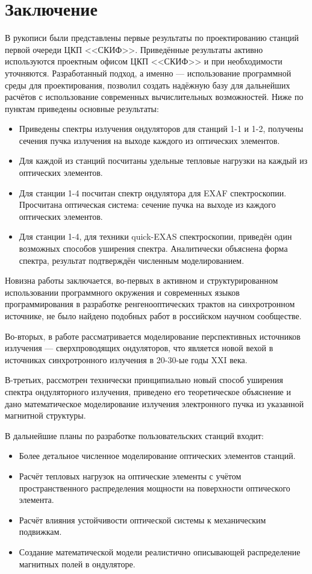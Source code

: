 \chapter{Заключение}

В рукописи были представлены первые результаты по проектированию станций первой очереди ЦКП <<СКИФ>>. Приведённые результаты активно используются проектным офисом ЦКП <<СКИФ>> и при необходимости уточняются. Разработанный подход, а именно --- использование программной среды для проектирования, позволил создать надёжную базу для дальнейших расчётов с использование современных вычислительных возможностей. Ниже по пунктам приведены основные результаты: 

\begin{itemize}
	\item Приведены спектры излучения ондуляторов для станций 1-1 и 1-2, получены сечения пучка излучения на выходе каждого из оптических элементов.
	\item Для каждой из станций посчитаны удельные тепловые нагрузки на каждый из оптических элементов.
	\item Для станции 1-4 посчитан спектр ондулятора для EXAF спектроскопии. Просчитана оптическая система: сечение пучка на выходе из каждого оптических элементов.
	\item Для станции 1-4, для техники quick-EXAS спектроскопии, приведён один возможных способов уширения спектра. Аналитически объяснена форма спектра, результат подтверждён численным моделированием.
\end{itemize}

Новизна работы заключается, во-первых в активном и структурированном использовании программного окружения и современных языков программирования в разработке ренгенооптических трактов на синхротронном источнике, не было найдено подобных работ в российском научном сообществе. 

Во-вторых, в работе рассматривается моделирование перспективных источников излучения --- сверхпроводящих ондуляторов, что является новой вехой в источниках синхротронного излучения в 20-30-ые годы XXI века. 

В-третьих, рассмотрен технически принципиально новый способ уширения спектра ондуляторного излучения, приведено его теоретическое объяснение и дано математическое моделирование излучения электронного пучка из указанной магнитной структуры.

В дальнейшие планы по разработке пользовательских станций входит: 

\begin{itemize}
	\item Более детальное численное моделирование оптических элементов станций.
	\item Расчёт тепловых нагрузок на оптические элементы с учётом пространственного распределения мощности на поверхности оптического элемента.
	\item Расчёт влияния устойчивости оптической системы к механическим подвижкам.
	\item Создание математической модели реалистично описывающей распределение магнитных полей в ондуляторе.
\end{itemize}